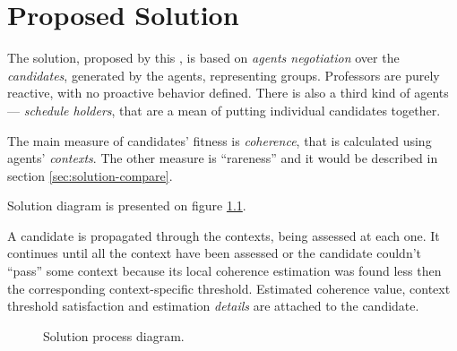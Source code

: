 \documentclass[ThesisDoc]{subfiles}
\providecommand{\rootdir}{.}
\begin{document}
\chapter{Proposed Solution}
\label{chapter:solution}


The solution, proposed by this \thisdoc, is based on \emph{agents negotiation}
over the \emph{candidates}, generated by the agents, representing groups.
Professors are purely reactive, with no proactive behavior defined.
There is also a third kind of agents --- \emph{schedule holders}, that are
a mean of putting individual candidates together.

The main measure of candidates' fitness is \emph{coherence}, that is calculated
using agents' \emph{contexts}. The other measure is ``rareness'' and it would be
described in section \ref{sec:solution-compare}.

Solution diagram is presented on figure \ref{fig:solution-flow}.






\medskip{}\medskip

\noindent
A candidate is propagated through the contexts, being assessed at each one.
It continues until all the context have been assessed or the candidate couldn't
``pass'' some context because its local coherence estimation was found less then
the corresponding context-specific threshold. Estimated coherence value,
context threshold satisfaction and estimation \emph{details}
are attached to the candidate.








\begin{figure}[h]
    \centering
    \resizebox{0.7\textwidth}{!}{
      
      }
  \caption{Solution process diagram.}
  \label{fig:solution-flow}
\end{figure}
\end{document}

